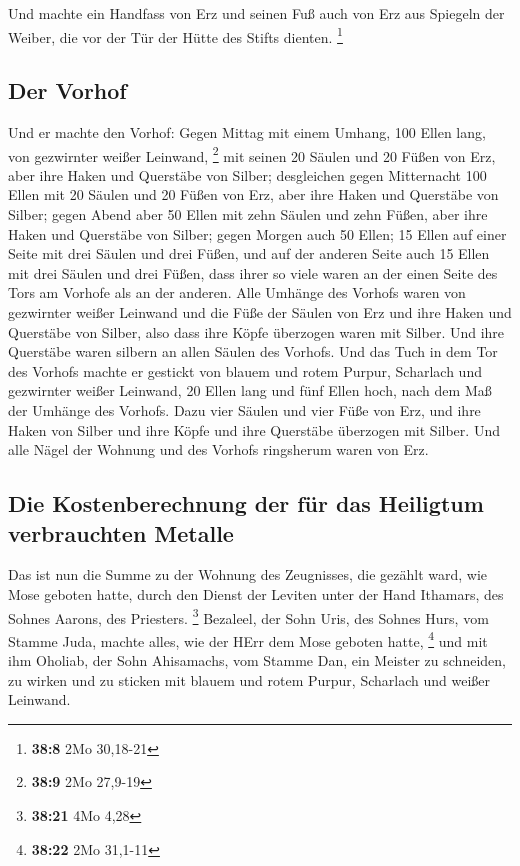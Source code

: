  Und machte ein Handfass von Erz und seinen Fuß auch von
Erz aus Spiegeln der Weiber, die vor der Tür der Hütte des Stifts
dienten. \footnote{\textbf{38:8} 2Mo 30,18-21}

\hypertarget{der-vorhof}{%
\subsection{Der Vorhof}\label{der-vorhof}}

 Und er machte den Vorhof: Gegen Mittag mit einem Umhang,
100 Ellen lang, von gezwirnter weißer Leinwand, \footnote{\textbf{38:9}
  2Mo 27,9-19}  mit seinen 20 Säulen und 20 Füßen von
Erz, aber ihre Haken und Querstäbe von Silber; 
desgleichen gegen Mitternacht 100 Ellen mit 20 Säulen und 20 Füßen von
Erz, aber ihre Haken und Querstäbe von Silber;  gegen
Abend aber 50 Ellen mit zehn Säulen und zehn Füßen, aber ihre Haken und
Querstäbe von Silber;  gegen Morgen auch 50 Ellen;
 15 Ellen auf einer Seite mit drei Säulen und drei Füßen,
 und auf der anderen Seite auch 15 Ellen mit drei Säulen
und drei Füßen, dass ihrer so viele waren an der einen Seite des Tors am
Vorhofe als an der anderen.  Alle Umhänge des Vorhofs
waren von gezwirnter weißer Leinwand  und die Füße der
Säulen von Erz und ihre Haken und Querstäbe von Silber, also dass ihre
Köpfe überzogen waren mit Silber. Und ihre Querstäbe waren silbern an
allen Säulen des Vorhofs.  Und das Tuch in dem Tor des
Vorhofs machte er gestickt von blauem und rotem Purpur, Scharlach und
gezwirnter weißer Leinwand, 20 Ellen lang und fünf Ellen hoch, nach dem
Maß der Umhänge des Vorhofs.  Dazu vier Säulen und vier
Füße von Erz, und ihre Haken von Silber und ihre Köpfe und ihre
Querstäbe überzogen mit Silber.  Und alle Nägel der
Wohnung und des Vorhofs ringsherum waren von Erz.

\hypertarget{die-kostenberechnung-der-fuxfcr-das-heiligtum-verbrauchten-metalle}{%
\subsection{Die Kostenberechnung der für das Heiligtum verbrauchten
Metalle}\label{die-kostenberechnung-der-fuxfcr-das-heiligtum-verbrauchten-metalle}}

 Das ist nun die Summe zu der Wohnung des Zeugnisses, die
gezählt ward, wie Mose geboten hatte, durch den Dienst der Leviten unter
der Hand Ithamars, des Sohnes Aarons, des Priesters. \footnote{\textbf{38:21}
  4Mo 4,28}  Bezaleel, der Sohn Uris, des Sohnes Hurs,
vom Stamme Juda, machte alles, wie der HErr dem Mose geboten hatte,
\footnote{\textbf{38:22} 2Mo 31,1-11}  und mit ihm
Oholiab, der Sohn Ahisamachs, vom Stamme Dan, ein Meister zu schneiden,
zu wirken und zu sticken mit blauem und rotem Purpur, Scharlach und
weißer Leinwand.

